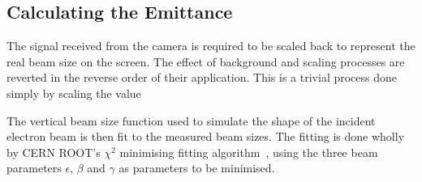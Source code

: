 \subsection{Calculating the Emittance}

The signal received from the camera is required to be scaled back to represent
the real beam size on the screen.  The effect of background and scaling
processes are reverted in the reverse order of their application. This is a
trivial process done simply by scaling the value 

The vertical beam size function used to simulate the shape of the incident
electron beam is then fit to the measured beam sizes. The fitting is done wholly
by CERN ROOT's \(\chi^2\) minimising fitting algorithm~\cite{Brun:1997pa}, using
the three beam parameters \(\epsilon\), \(\beta\) and \(\gamma\) as parameters
to be minimised.

